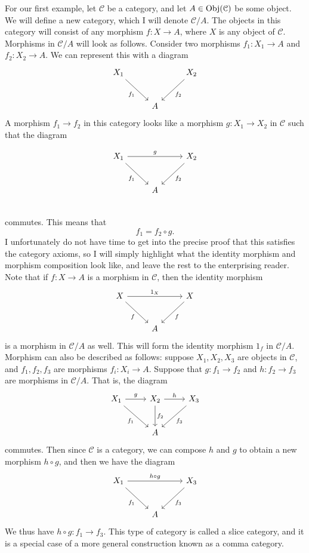 \documentclass[11pt, letterpaper]{article}
\begin{document}
For our first example, let $\mathcal{C} $ be a category, and let $A\in \operatorname{Obj}(\mathcal{C} ) $ be some object. We will define a new category, which I will denote $\mathcal{C} /A$. The objects in this category will consist of any morphism $f : X \to A$, where $X$ is any object of $\mathcal{C} $. Morphisms in $\mathcal{C} /A$ will look as follows. Consider two morphisms $f_1 : X_1 \to A$ and $f_2: X_2 \to A$. We can represent this with a diagram
\[\begin{tikzcd}[row sep = 2.5em, column sep = 2.5em]
	X_1\ar[dr, "f_1"']&&X_2\ar[dl, "f_2"]\\
				 &A
\end{tikzcd}\]
A morphism $f_1\to f_2$ in this category looks like a morphism $g : X_1 \to X_2$ in $\mathcal{C} $ such that the diagram
\begin{diagram}[ht]
	\[\begin{tikzcd}[row sep = 2.5em, column sep = 2.5em]
		X_1\ar[dr, "f_1"']\ar[rr, "g"]&&X_2\ar[dl, "f_2"]\\
					      &A
	\end{tikzcd}\]
	\caption{Morphisms in $\mathcal{C} /A$}\label{dgm:3}
\end{diagram}\\
commutes. This means that
\[
	f_1=f_2\circ g
.\]
I unfortunately do not have time to get into the precise proof that this satisfies the category axioms, so I will simply highlight what the identity morphism and morphism composition look like, and leave the rest to the enterprising reader. Note that if $f : X \to A$ is a morphism in $\mathcal{C} $, then the identity morphism
\[\begin{tikzcd}[row sep = 2.5em, column sep = 2.5em]
	X\ar[rr, "1_X"]\ar[dr, "f"']&&X\ar[dl, "f"]\\
				    &A
\end{tikzcd}\]
is a morphism in $\mathcal{C} /A$ as well. This will form the identity morphism $1_f$ in $\mathcal{C} /A$. Morphism can also be described as follows: suppose $X_1,X_2,X_3$ are objects in $\mathcal{C} $, and $f_1,f_2,f_3$ are morphisms $f_i : X_i \to A$. Suppose that $g : f_1 \to f_2$ and $h : f_2 \to f_3$ are morphisms in $\mathcal{C} /A$. That is, the diagram
\[\begin{tikzcd}[row sep = 2.5em, column sep = 2.5em]
	X_1\ar[r, "g"]\ar[dr, "f_1"']&X_2\ar[r, "h"]\ar[d, "f_2"]&X_3\ar[dl, "f_3"]\\
				     &A
\end{tikzcd}\]
commutes. Then since $\mathcal{C} $ is a category, we can compose $h$ and $g$ to obtain a new morphism $h\circ g$, and then we have the diagram
\[\begin{tikzcd}[row sep = 2.5em, column sep = 2.5em]
	X_1\ar[rr, "h\circ g"]\ar[dr, "f_1"']&&X_3\ar[dl, "f_3"]\\
					     &A
\end{tikzcd}\]
We thus have $h\circ g : f_1 \to f_3$. This type of category is called a slice category, and it is a special case of a more general construction known as a comma category.
\end{document}
